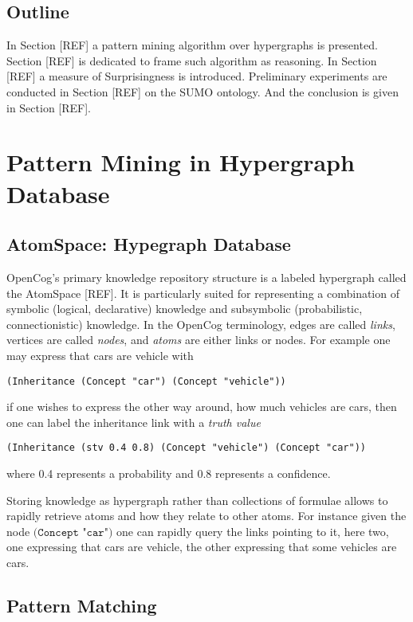 \documentclass[runningheads]{llncs}
\begin{document}
\subsection{Outline}

In Section [REF] a pattern mining algorithm over hypergraphs is
presented. Section [REF] is dedicated to frame such algorithm as
reasoning. In Section [REF] a measure of Surprisingness is
introduced. Preliminary experiments are conducted in Section [REF] on
the SUMO ontology. And the conclusion is given in Section [REF].

\section{Pattern Mining in Hypergraph Database}

\subsection{AtomSpace: Hypegraph Database}

OpenCog's primary knowledge repository structure is a labeled
hypergraph called the AtomSpace [REF]. It is particularly suited for
representing a combination of symbolic (logical, declarative)
knowledge and subsymbolic (probabilistic, connectionistic)
knowledge. In the OpenCog terminology, edges are called \emph{links},
vertices are called \emph{nodes}, and \emph{atoms} are either links or
nodes.  For example one may express that cars are vehicle with
\begin{verbatim}
(Inheritance (Concept "car") (Concept "vehicle"))
\end{verbatim}
if one wishes to express the other way around, how much vehicles are
cars, then one can label the inheritance link with a \emph{truth
  value}
\begin{verbatim}
(Inheritance (stv 0.4 0.8) (Concept "vehicle") (Concept "car"))
\end{verbatim}
where 0.4 represents a probability and 0.8 represents a confidence.

Storing knowledge as hypergraph rather than collections of formulae
allows to rapidly retrieve atoms and how they relate to other
atoms. For instance given the node $\texttt{(Concept "car")}$ one can
rapidly query the links pointing to it, here two, one expressing that
cars are vehicle, the other expressing that some vehicles are cars.

\subsection{Pattern Matching}
\end{document}

